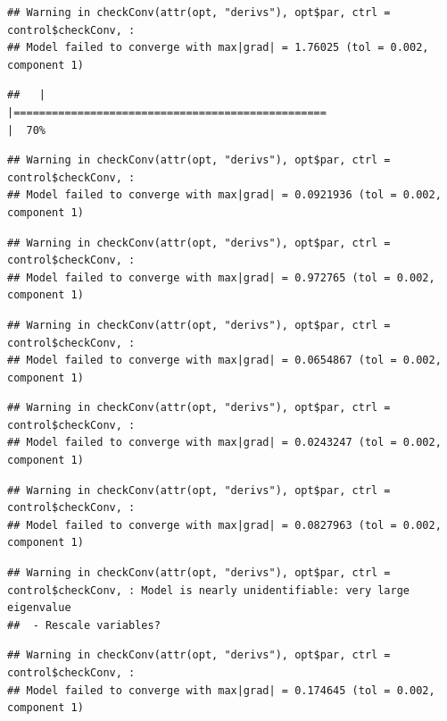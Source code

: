 \documentclass[
  12pt,
]{book}
\begin{document}
\begin{verbatim}
## Warning in checkConv(attr(opt, "derivs"), opt$par, ctrl = control$checkConv, :
## Model failed to converge with max|grad| = 1.76025 (tol = 0.002, component 1)
\end{verbatim}

\begin{verbatim}
##   |                                                                              |=================================================                     |  70%
\end{verbatim}

\begin{verbatim}
## Warning in checkConv(attr(opt, "derivs"), opt$par, ctrl = control$checkConv, :
## Model failed to converge with max|grad| = 0.0921936 (tol = 0.002, component 1)
\end{verbatim}

\begin{verbatim}
## Warning in checkConv(attr(opt, "derivs"), opt$par, ctrl = control$checkConv, :
## Model failed to converge with max|grad| = 0.972765 (tol = 0.002, component 1)
\end{verbatim}

\begin{verbatim}
## Warning in checkConv(attr(opt, "derivs"), opt$par, ctrl = control$checkConv, :
## Model failed to converge with max|grad| = 0.0654867 (tol = 0.002, component 1)
\end{verbatim}

\begin{verbatim}
## Warning in checkConv(attr(opt, "derivs"), opt$par, ctrl = control$checkConv, :
## Model failed to converge with max|grad| = 0.0243247 (tol = 0.002, component 1)
\end{verbatim}

\begin{verbatim}
## Warning in checkConv(attr(opt, "derivs"), opt$par, ctrl = control$checkConv, :
## Model failed to converge with max|grad| = 0.0827963 (tol = 0.002, component 1)
\end{verbatim}

\begin{verbatim}
## Warning in checkConv(attr(opt, "derivs"), opt$par, ctrl = control$checkConv, : Model is nearly unidentifiable: very large eigenvalue
##  - Rescale variables?
\end{verbatim}

\begin{verbatim}
## Warning in checkConv(attr(opt, "derivs"), opt$par, ctrl = control$checkConv, :
## Model failed to converge with max|grad| = 0.174645 (tol = 0.002, component 1)
\end{verbatim}
\end{document}
